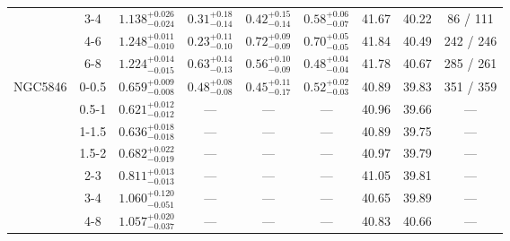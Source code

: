 \documentclass[structabstract]{aa}
\begin{document}
{{\begin{longtable}{lcccccccc}
 & 3-4 & $ 1.138 _{- 0.024 }^{+ 0.026 } $ & $  0.31 _{-  0.14 }^{+  0.18 } $ & $  0.42 _{-  0.14 }^{+  0.15 } $ & $  0.58 _{-  0.07 }^{+  0.06 } $ &  41.67 & 40.22 &    86 /   111 \\
 & 4-6 & $ 1.248 _{- 0.010 }^{+ 0.011 } $ & $  0.23 _{-  0.10 }^{+  0.11 } $ & $  0.72 _{-  0.09 }^{+  0.09 } $ & $  0.70 _{-  0.05 }^{+  0.05 } $ &  41.84 & 40.49 &   242 /   246 \\
 & 6-8 & $ 1.224 _{- 0.015 }^{+ 0.014 } $ & $  0.63 _{-  0.13 }^{+  0.14 } $ & $  0.56 _{-  0.09 }^{+  0.10 } $ & $  0.48 _{-  0.04 }^{+  0.04 } $ &  41.78 & 40.67 &   285 /   261 \\
\hline
NGC5846 & 0-0.5 & $ 0.659 _{- 0.008 }^{+ 0.009 } $ & $  0.48 _{-  0.08 }^{+  0.08 } $ & $  0.45 _{-  0.17 }^{+  0.11 } $ & $  0.52 _{-  0.03 }^{+  0.02 } $ &  40.89 & 39.83 &   351 /   359 \\
 & 0.5-1 & $ 0.621 _{- 0.012 }^{+ 0.012 } $ & --- & --- & --- &  40.96 & 39.66 & --- \\
 & 1-1.5 & $ 0.636 _{- 0.018 }^{+ 0.018 } $ & --- & --- & --- &  40.89 & 39.75 & --- \\
 & 1.5-2 & $ 0.682 _{- 0.019 }^{+ 0.022 } $ & --- & --- & --- &  40.97 & 39.79 & --- \\
 & 2-3 & $ 0.811 _{- 0.013 }^{+ 0.013 } $ & --- & --- & --- &  41.05 & 39.81 & --- \\
 & 3-4 & $ 1.060 _{- 0.051 }^{+ 0.120 } $ & --- & --- & --- &  40.65 & 39.89 & --- \\
 & 4-8 & $ 1.057 _{- 0.037 }^{+ 0.020 } $ & --- & --- & --- &  40.83 & 40.66 & --- \\
\end{longtable}
}

}


\appendix
\end{document}
